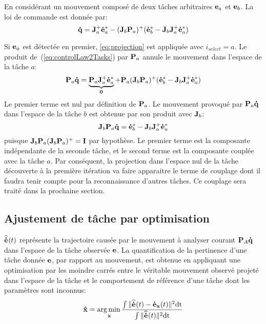 En considérant un mouvement composé de deux t\^aches arbitraires ${\mathbf{e}}_a$ et ${\mathbf{e}}_b$.
La loi de commande est donnée par:
\begin{equation}
  \mbf{\dot{q}} = \mbf{J}_a^+\mbf{\dot{e}}_a^* - (\mbf{J}_b\mbf{P}_a)^+ (\mbf{\dot{e}}_b^* - \mbf{J}_b\mbf{J}_a^+\mbf{\dot{e}}_a^*)
  \label{eq:controlLaw2Tasks}
\end{equation}

Si ${\mathbf{e}}_a$ est détectée en premier, \eqref{eq:projection} est appliquée avec
$i_{select} = a$. Le produit de~(\ref{eq:controlLaw2Tasks}) par ${\mathbf{P}}_a$
annule le mouvement dans l'espace de la t\^ache $a$:
\begin{equation}
  \mbf{P}_a \mbf{\dot{q}} = \underbrace{\mbf{P}_a \mbf{J}_a^+\mbf{\dot{e}}_a^*}_{\mbf{0}} + \mbf{P}_a (\mbf{J}_b\mbf{P}_a)^+ (\mbf{\dot{e}}_b^* - \mbf{J}_b\mbf{J}_a^+\mbf{\dot{e}}_a^*)  
  \label{eq:cancel1_2:1}
\end{equation}
Le premier terme est nul par définition de ${\mathbf{P}}_a$.
Le mouvement provoqué par ${\mathbf{P}}_a {\mathbf{\dot{q}}}$ dans l'espace de la t\^ache $b$ est 
obtenue par son produit avec ${\mathbf{J}}_b$:
\begin{equation}
  \mbf{J}_b \mbf{P}_a \mbf{\dot{q}} = \mbf{\dot{e}}_b^* -
  \mbf{J}_b  \mbf{J}_a^+ \mbf{\dot{e}}_a^*  
  \label{eq:J2P1q}
\end{equation}
puisque ${\mathbf{J}}_b{\mathbf{P}}_a({\mathbf{J}}_b{\mathbf{P}}_a)^+ = {\mathbf{I}}$ par hypothèse.
Le premier terme est la composante indépendante de la seconde t\^ache, et
le second terme est la composante couplée avec la t\^ache $a$.
Par conséquent, la projection dans l'espace nul de la t\^ache découverte à la première itération
va faire apparaitre le terme de couplage dont il faudra tenir compte pour la reconnaissance d'autres t\^aches.
Ce couplage sera traité dans la prochaine section.

\subsection{Ajustement de t\^ache par optimisation} \label{sec:alg2:proj}
${\mathbf{\widehat{\dot{e}}}}_{}(t)$ représente la trajectoire causée par le mouvement à analyser courant ${\mathbf{P}}_A{\mathbf{\dot{q}}}$ 
dans l'espace de la t\^ache observée ${\mathbf{e}}$. La quantification de la pertinence
d'une t\^ache donnée ${\mathbf{e}}$, par rapport au mouvement,
est obtenue en appliquant une optimisation par les moindre carrés
entre le véritable mouvement observé projeté dans l'espace de la t\^ache et le comportement de 
référence d'une t\^ache dont les paramètres sont inconnus:
\begin{equation}
  \mbf{\hat x} = \underset{\mbf{x}}\argmin \frac{\int \Vert \medoth{}(t) - \medot{\mbf x}(t) \Vert^2 \mathrm{dt}}{\int \Vert \medoth{}(t) \Vert^2 \mathrm{dt}}
\label{optimProblem}
\end{equation}

